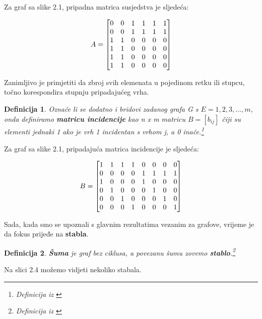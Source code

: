 \documentclass[times, utf8, zavrsni]{fer}
\newtheorem{definition}{Definicija}[section]
\begin{document}
Za graf sa slike 2.1, pripadna matrica susjedstva je sljedeća:

\[
\centering
A = 
\begin{bmatrix}
	0 & 0 & 1 & 1 & 1 & 1 \\
	0 & 0 & 1 & 1 & 1 & 1\\
	1 & 1 & 0 & 0 & 0 & 0 \\
	1 & 1 & 0 & 0 & 0 & 0 \\
	1 & 1 & 0 & 0 & 0 & 0 \\
	1 & 1 & 0 & 0 & 0 & 0
\end{bmatrix}
\]

Zanimljivo je primjetiti da zbroj svih elemenata u pojedinom retku ili stupcu, točno korespondira stupnju pripadajućeg vrha.

\begin{definition}
	Označe li se dodatno i bridovi zadanog grafa G s $E = {1, 2, 3, ..., m}$, onda definiramo \textbf{matricu incidencije} kao n x m matricu $B = [b_{ij}]$ čiji su elementi jednaki 1 ako je vrh 1 incidentan s vrhom j, a 0 inače.\footnote{Definicija iz \cite{KKNP}}
\end{definition}

Za graf sa slike 2.1, pripadajuća matrica incidencije je sljedeća:

\[
\centering
B = 
\begin{bmatrix}
	1 & 1 & 1 & 1 & 0 & 0 & 0 & 0 \\
	0 & 0 & 0 & 0 & 1 & 1 & 1 & 1 \\
	1 & 0 & 0 & 0 & 1 & 0 & 0 & 0 \\
	0 & 1 & 0 & 0 & 0 & 1 & 0 & 0 \\
	0 & 0 & 1 & 0 & 0 & 0 & 1 & 0 \\
	0 & 0 & 0 & 1 & 0 & 0 & 0 & 1
\end{bmatrix}
\]

Sada, kada smo se upoznali s glavnim rezultatima vezanim za grafove, vrijeme je da fokus prijeđe na \textbf{stabla}.

\begin{definition}
	\textbf{Šuma} je graf bez ciklusa, a povezanu šumu zovemo \textbf{stablo}.\footnote{Definicija iz \cite{KKNP}}
\end{definition}

Na slici 2.4 možemo vidjeti nekoliko stabala.
\end{document}
